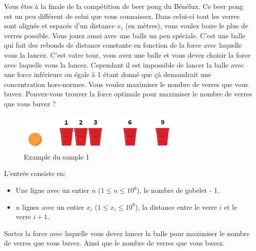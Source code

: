 \problemname{\problemyamlname}


\newcommand{\maxn}{10^{6}}

Vous êtes à la finale de la compétition de beer pong du Bénélux. Ce beer pong est un peu différent de celui que vous connaissez. Dans celui-ci tout les verres sont alignés et espacés d'un distance $x_i$ (en mètres), vous voulez boire le plus de verres possible. Vous jouez aussi avec une balle un peu spéciale. C'est une balle qui fait des rebonds de distance constante en fonction de la force avec laquelle vous la lancez.
C'est votre tour, vous avez une balle et vous devez choisir la force avec laquelle vous la lancez. Cependant il est impossible de lancer la balle avec une force inférieure ou égale à 1 étant donné que çà demandrait une concentration hors-normes. Vous voulez maximiser le nombre de verres que vous buvez. Pouvez-vous trouver la force optimale pour maximiser le nombre de verres que vous buvez ?
\smallskip
\begin{figure}[h]
    \centering
    \includegraphics[width=0.7\textwidth]{illustration.png}
    \caption{Example du sample 1}
\end{figure}

\begin{Input}
    L'entrée consiste en:
    \begin{itemize}
        \item Une ligne avec un entier  $n$ ($1\leq n\leq \maxn$), le nombre de gobelet - 1.
        \item $n$ lignes avec un entier $x_i$ ($1\leq x_i\leq \maxn$), la distance entre le verre $i$ et le verre $i+1$.
    \end{itemize}
\end{Input}

\begin{Output}
    Sortez la force avec laquelle vous devez lancer la balle pour maximiser le nombre de verres que vous buvez. Ainsi que le nombre de verres que vous buvez.
\end{Output}
